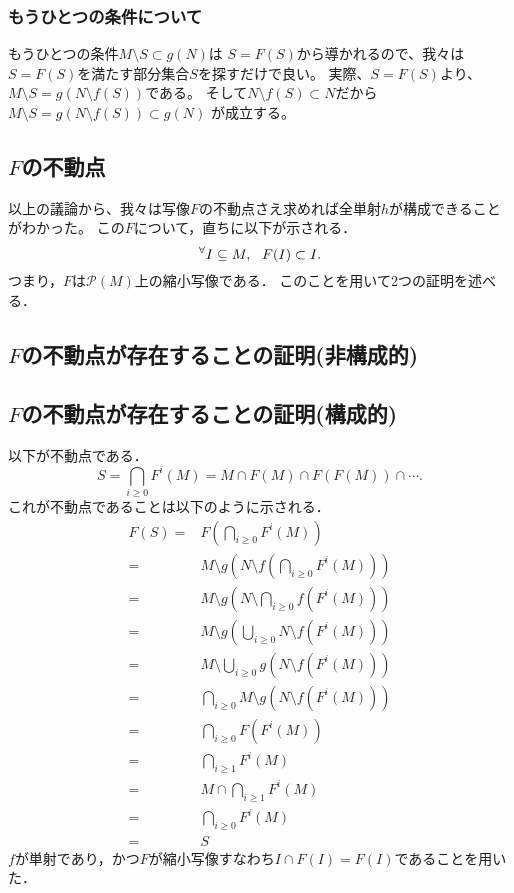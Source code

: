 \documentclass[a4j, 10pt]{jarticle}
\begin{document}
            \subsubsection{もうひとつの条件について}
            もうひとつの条件$M \setminus S \subset g(N)$は
            $S=F(S)$から導かれるので、我々は$S=F(S)$を満たす部分集合$S$を探すだけで良い。
            実際、$S=F(S)$より、$M \setminus S=g(N \setminus f(S))$である。
            そして$N \setminus f(S) \subset N $だから$M \setminus S=g(N \setminus f(S)) \subset g(N)$
            が成立する。

        \subsection{$F$の不動点}
        以上の議論から、我々は写像$F$の不動点さえ求めれば全単射$h$が構成できることがわかった。
        この$F$について，直ちに以下が示される．
        \[ {}^{\forall} I \subseteq M,~~ F(I) \subset I. \]
        つまり，$F$は$\mathcal{P}(M)$上の縮小写像である．
        このことを用いて2つの証明を述べる．

        \subsection{$F$の不動点が存在することの証明(非構成的)}

        \subsection{$F$の不動点が存在することの証明(構成的)}
            以下が不動点である．
            \[ S=\bigcap_{i \geq 0}{F^{i}(M)}=M \cap F(M) \cap F(F(M)) \cap \cdots. \]
            これが不動点であることは以下のように示される．
            \begin{align*}
            F(S)
            =&F \left(\bigcap_{i \geq 0}{F^{i}(M)} \right) \\
            =&M \setminus g \left(N \setminus f \left(\bigcap_{i \geq 0}{F^{i}(M)} \right) \right) \\
            =&M \setminus g \left(N \setminus \bigcap_{i \geq 0}{f(F^{i}(M))} \right)\\
            =&M \setminus g \left(\bigcup_{i \geq 0}{N \setminus f(F^{i}(M))} \right)\\
            =&M \setminus \bigcup_{i \geq 0}{g(N \setminus f(F^{i}(M)))}\\
            =& \bigcap_{i \geq 0}{M \setminus g(N \setminus f(F^{i}(M)))}\\
            =& \bigcap_{i \geq 0}{F(F^{i}(M))} \\
            =& \bigcap_{i \geq 1}{F^{i}(M)} \\
            =& M \cap \bigcap_{i \geq 1}{F^{i}(M)} \\
            =& \bigcap_{i \geq 0}{F^{i}(M)} \\
            =& S
            \end{align*}
            $f$が単射であり，かつ$F$が縮小写像すなわち$I \cap F(I)=F(I)$であることを用いた．
\end{document}

